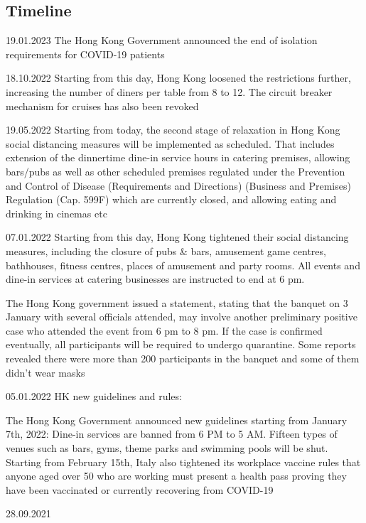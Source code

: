 
\subsection{Timeline}

19.01.2023
The Hong Kong Government announced the end of isolation requirements for COVID-19 patients

18.10.2022
Starting from this day, Hong Kong loosened the restrictions further, increasing the number of diners per table from 8 to 12. The circuit breaker mechanism for cruises has also been revoked

19.05.2022
Starting from today, the second stage of relaxation in Hong Kong social distancing measures will be implemented as scheduled. That includes extension of the dinnertime dine-in service hours in catering premises, allowing bars/pubs as well as other scheduled premises regulated under the Prevention and Control of Disease (Requirements and Directions) (Business and Premises) Regulation (Cap. 599F) which are currently closed, and allowing eating and drinking in cinemas etc

07.01.2022
Starting from this day, Hong Kong tightened their social distancing measures, including the closure of pubs \& bars, amusement game centres, bathhouses, fitness centres, places of amusement and party rooms. All events and dine-in services at catering businesses are instructed to end at 6 pm.

The Hong Kong government issued a statement, stating that the banquet on 3 January with several officials attended, may involve another preliminary positive case who attended the event from 6 pm to 8 pm. If the case is confirmed eventually, all participants will be required to undergo quarantine. Some reports revealed there were more than 200 participants in the banquet and some of them didn't wear masks

05.01.2022
HK new guidelines and rules:

The Hong Kong Government announced new guidelines starting from January 7th, 2022: 
Dine-in services are banned from 6 PM to 5 AM. 
Fifteen types of venues such as bars, gyms, theme parks and swimming pools will be shut.
Starting from February 15th, Italy also tightened its workplace vaccine rules that anyone aged over 50 who are working must present a health pass proving they have been vaccinated or currently recovering from COVID-19

28.09.2021

